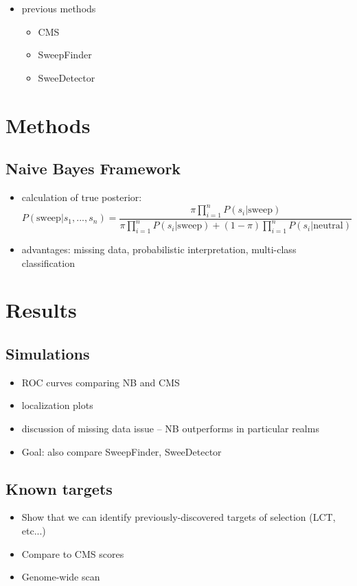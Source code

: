 \documentclass{article}
\begin{document}
\begin{itemize}
\item previous methods
\begin{itemize}
\item CMS
\item SweepFinder
\item SweeDetector
\end{itemize}
\end{itemize}

\bigskip

\section{Methods}
\subsection{Naive Bayes Framework}
\begin{itemize}
\item calculation of true posterior: \\
$P(\textrm{sweep}|s_1,...,s_n) = \dfrac{\pi\prod_{i=1}^n P(s_i|\textrm{sweep})}{\pi\prod_{i=1}^n P(s_i|\textrm{sweep}) + (1-\pi)\prod_{i=1}^n P(s_i|\textrm{neutral})}$
\item advantages: missing data, probabilistic interpretation, multi-class classification
\end{itemize}
\bigskip

\section{Results}
\subsection{Simulations}
\begin{itemize}
\item ROC curves comparing NB and CMS
\item localization plots
\item discussion of missing data issue -- NB outperforms in particular realms
\item Goal: also compare SweepFinder, SweeDetector
\end{itemize}
\bigskip

\subsection{Known targets}
\begin{itemize}
\item Show that we can identify previously-discovered targets of selection (LCT, etc...)
\item Compare to CMS scores
\item Genome-wide scan
\end{itemize}
\bigskip
\end{document}
